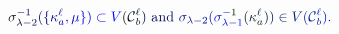 \documentclass[12pt]{article}
\begin{document}
\makeatletter
\renewcommand*{\@textcolor}[3]{%
  \protect\leavevmode
  \begingroup
    \color#1{#2}#3%
  \endgroup
}
\makeatother
\begin{displaymath}
\mathcolor[RGB]{0,0,15}{\sigma} _ { \mathcolor[RGB]{0,0,30}{\lambda} \mathcolor[RGB]{0,0,45}{-} \mathcolor[RGB]{0,0,60}{2} } ^ { \mathcolor[RGB]{0,0,75}{-} \mathcolor[RGB]{0,0,90}{1} } \mathcolor[RGB]{0,0,105}{(} \mathcolor[RGB]{0,0,120}{\{} \mathcolor[RGB]{0,0,135}{\kappa} _ { \mathcolor[RGB]{0,0,150}{a} } ^ { \mathcolor[RGB]{0,0,165}{\ell} } \mathcolor[RGB]{0,0,180}{,} \mathcolor[RGB]{0,0,195}{\mu} \mathcolor[RGB]{0,0,210}{\}} \mathcolor[RGB]{0,0,225}{)} \mathcolor[RGB]{0,0,240}{\subset} \mathcolor[RGB]{0,0,255}{V} \mathcolor[RGB]{0,15,0}{(} \mathcal { \mathcolor[RGB]{0,15,15}{C} } _ { \mathcolor[RGB]{0,15,30}{b} } ^ { \mathcolor[RGB]{0,15,45}{\ell} } \mathcolor[RGB]{0,15,60}{)} \mathrm { ~ \mathcolor[RGB]{0,15,75}{a} \mathcolor[RGB]{0,15,90}{n} \mathcolor[RGB]{0,15,105}{d} ~ } \mathcolor[RGB]{0,15,120}{\sigma} _ { \mathcolor[RGB]{0,15,135}{\lambda} \mathcolor[RGB]{0,15,150}{-} \mathcolor[RGB]{0,15,165}{2} } \mathcolor[RGB]{0,15,180}{(} \mathcolor[RGB]{0,15,195}{\sigma} _ { \mathcolor[RGB]{0,15,210}{\lambda} \mathcolor[RGB]{0,15,225}{-} \mathcolor[RGB]{0,15,240}{1} } ^ { \mathcolor[RGB]{0,15,255}{-} \mathcolor[RGB]{0,30,0}{1} } \mathcolor[RGB]{0,30,15}{(} \mathcolor[RGB]{0,30,30}{\kappa} _ { \mathcolor[RGB]{0,30,45}{a} } ^ { \mathcolor[RGB]{0,30,60}{\ell} } \mathcolor[RGB]{0,30,75}{)} \mathcolor[RGB]{0,30,90}{)} \mathcolor[RGB]{0,30,105}{\in} \mathcolor[RGB]{0,30,120}{V} \mathcolor[RGB]{0,30,135}{(} \mathcal { \mathcolor[RGB]{0,30,150}{C} } _ { \mathcolor[RGB]{0,30,165}{b} } ^ { \mathcolor[RGB]{0,30,180}{\ell} } \mathcolor[RGB]{0,30,195}{)} \mathcolor[RGB]{0,30,210}{.}
\end{displaymath}
\end{document}
